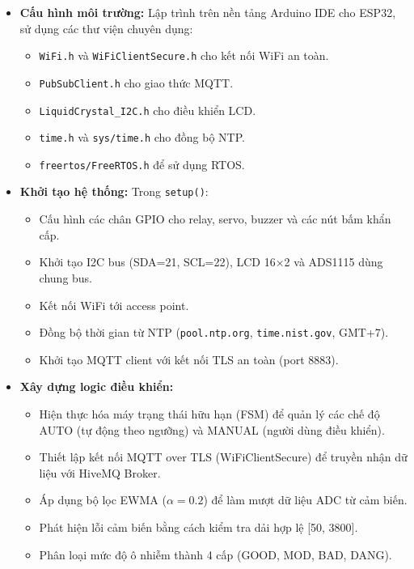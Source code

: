 \documentclass[../BTL_PTIT.tex]{subfiles}
\begin{document}
\begin{itemize}[label=\textbullet]
    \item \textbf{Cấu hình môi trường:} Lập trình trên nền tảng Arduino IDE cho ESP32, sử dụng các thư viện chuyên dụng:
    \begin{itemize}[label=--]
        \item \texttt{WiFi.h} và \texttt{WiFiClientSecure.h} cho kết nối WiFi an toàn.
        \item \texttt{PubSubClient.h} cho giao thức MQTT.
        \item \texttt{LiquidCrystal\_I2C.h} cho điều khiển LCD.
        \item \texttt{time.h} và \texttt{sys/time.h} cho đồng bộ NTP.
        \item \texttt{freertos/FreeRTOS.h} để sử dụng RTOS.
    \end{itemize}
    
    \item \textbf{Khởi tạo hệ thống:} Trong \texttt{setup()}:
    \begin{itemize}[label=--]
        \item Cấu hình các chân GPIO cho relay, servo, buzzer và các nút bấm khẩn cấp.
        \item Khởi tạo I2C bus (SDA=21, SCL=22), LCD 16×2 và ADS1115 dùng chung bus.
        \item Kết nối WiFi tới access point.
        \item Đồng bộ thời gian từ NTP (\texttt{pool.ntp.org}, \texttt{time.nist.gov}, GMT+7).
        \item Khởi tạo MQTT client với kết nối TLS an toàn (port 8883).
    \end{itemize}
    
    \item \textbf{Xây dựng logic điều khiển:}
    \begin{itemize}[label=--]
        \item Hiện thực hóa máy trạng thái hữu hạn (FSM) để quản lý các chế độ AUTO (tự động theo ngưỡng) và MANUAL (người dùng điều khiển).
        \item Thiết lập kết nối MQTT over TLS (WiFiClientSecure) để truyền nhận dữ liệu với HiveMQ Broker.
        \item Áp dụng bộ lọc EWMA ($\alpha = 0.2$) để làm mượt dữ liệu ADC từ cảm biến.
        \item Phát hiện lỗi cảm biến bằng cách kiểm tra dải hợp lệ [50, 3800].
        \item Phân loại mức độ ô nhiễm thành 4 cấp (GOOD, MOD, BAD, DANG).
    \end{itemize}
    

\end{itemize}
\end{document}
